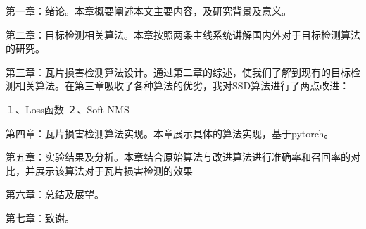 第一章：绪论。本章概要阐述本文主要内容，及研究背景及意义。

第二章：目标检测相关算法。本章按照两条主线系统讲解国内外对于目标检测算法的研究。

第三章：瓦片损害检测算法设计。通过第二章的综述，使我们了解到现有的目标检测相关算法。在第三章吸收了各种算法的优劣，我对SSD算法进行了两点改进：

１、Loss函数
２、Soft-NMS

第四章：瓦片损害检测算法实现。本章展示具体的算法实现，基于pytorch。

第五章：实验结果及分析。本章结合原始算法与改进算法进行准确率和召回率的对比，并展示该算法对于瓦片损害检测的效果　

第六章：总结及展望。

第七章：致谢。